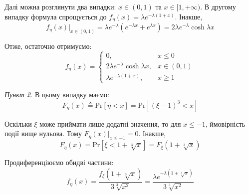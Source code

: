 \documentclass[oneside,solution]{karazin-prob-theory-assign}
\begin{document}
Далі можна розглянути два випадки: $x \in (0,1)$ та $x \in [1,+\infty)$. В другому випадку формула спрощується до $f_{\eta}(x)=\lambda e^{-\lambda(1+x)}$. Інакше,
\begin{equation}
    f_{\eta}(x)\Big|_{x \in (0,1)} = \lambda e^{-\lambda}(e^{-\lambda x} + e^{\lambda x}) = 2\lambda e^{-\lambda } \cosh \lambda x
\end{equation}

Отже, остаточно отримуємо:
\begin{equation}
    \boxed{f_{\eta}(x) = \begin{cases}
        0, & x \leq 0 \\
        2\lambda e^{-\lambda} \cosh \lambda x, & x \in (0,1) \\
        \lambda e^{-\lambda (1+x)}, & x \geq 1
    \end{cases}}
\end{equation}

\textit{Пункт 2.} В цьому випадку маємо:
\begin{equation}
    F_{\eta}(x) \triangleq \text{Pr}[\eta < x] = \text{Pr}[(\xi - 1)^3 < x]
\end{equation}

Оскільки $\xi$ може приймати лише додатні значення, то для $x \leq -1$, ймовірність події вище нульова. Тому $F_{\eta}(x)\Big|_{x \leq -1} = 0$. Інакше,
\begin{equation}
    F_{\eta}(x) = \text{Pr}[\xi < 1 + \sqrt[3]{x}] = F_{\xi}(1+\sqrt[3]{x})
\end{equation}

Продиференціюємо обидві частини:
\begin{equation}
    f_{\eta}(x) = \frac{f_{\xi}(1+\sqrt[3]{x})}{3\sqrt[3]{x^2}} = \frac{\lambda e^{-\lambda (1+\sqrt[3]{x})}}{3\sqrt[3]{x^2}}
\end{equation}
\end{document}
